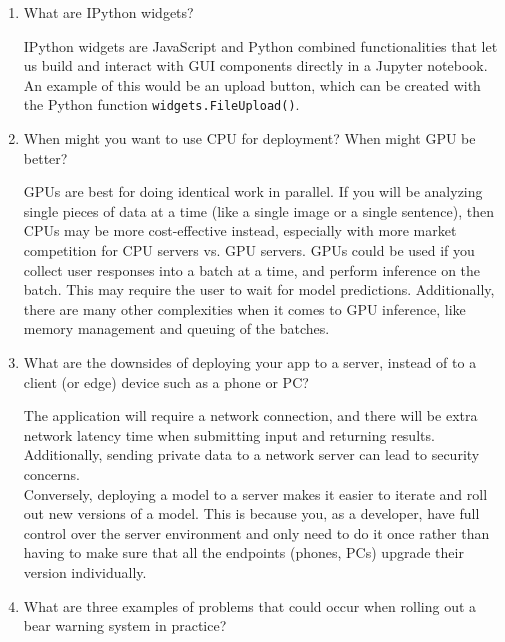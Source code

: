 \documentclass[12pt,a4paper]{article}
\begin{document}
\begin{enumerate}
\item What are IPython widgets? \\

\smallbreak

IPython widgets are JavaScript and Python combined functionalities that let us build and interact with GUI components directly in a Jupyter notebook. An example of this would be an upload button, which can be created with the Python function \verb/widgets.FileUpload()/.

\bigbreak

\item When might you want to use CPU for deployment? When might GPU be better? \\

\smallbreak

GPUs are best for doing identical work in parallel. If you will be analyzing single pieces of data at a time (like a single image or a single sentence), then CPUs may be more cost-effective instead, especially with more market competition for CPU servers vs. GPU servers. GPUs could be used if you collect user responses into a batch at a time, and perform inference on the batch. This may require the user to wait for model predictions. Additionally, there are many other complexities when it comes to GPU inference, like memory management and queuing of the batches.

\bigbreak

\item What are the downsides of deploying your app to a server, instead of to a client (or edge) device such as a phone or PC? \\

\smallbreak

The application will require a network connection, and there will be extra network latency time when submitting input and returning results. Additionally, sending private data to a network server can lead to security concerns. \\
\smallbreak
Conversely, deploying a model to a server makes it easier to iterate and roll out new versions of a model. This is because you, as a developer, have full control over the server environment and only need to do it once rather than having to make sure that all the endpoints (phones, PCs) upgrade their version individually.

\bigbreak

\item What are three examples of problems that could occur when rolling out a bear warning system in practice? \\


\end{enumerate}
\end{document}
